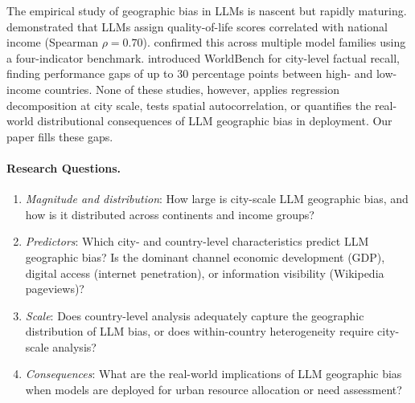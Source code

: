 \documentclass[12pt]{article}
\begin{document}
The empirical study of geographic bias in LLMs is nascent but rapidly maturing. \citet{manvi2024geographically} demonstrated that LLMs assign quality-of-life scores correlated with national income (Spearman $\rho = 0.70$). \citet{decoupes2025geographical} confirmed this across multiple model families using a four-indicator benchmark. \citet{moayeri2024worldbench} introduced WorldBench for city-level factual recall, finding performance gaps of up to 30 percentage points between high- and low-income countries. None of these studies, however, applies regression decomposition at city scale, tests spatial autocorrelation, or quantifies the real-world distributional consequences of LLM geographic bias in deployment. Our paper fills these gaps.

\paragraph{Research Questions.}
\begin{enumerate}[label=\textbf{RQ\arabic*.}]
    \item \textit{Magnitude and distribution}: How large is city-scale LLM geographic bias, and how is it distributed across continents and income groups?
    \item \textit{Predictors}: Which city- and country-level characteristics predict LLM geographic bias? Is the dominant channel economic development (GDP), digital access (internet penetration), or information visibility (Wikipedia pageviews)?
    \item \textit{Scale}: Does country-level analysis adequately capture the geographic distribution of LLM bias, or does within-country heterogeneity require city-scale analysis?
    \item \textit{Consequences}: What are the real-world implications of LLM geographic bias when models are deployed for urban resource allocation or need assessment?
\end{enumerate}
\end{document}
